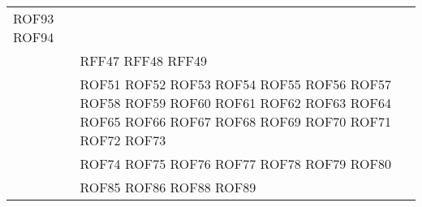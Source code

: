 \documentclass[../DefinizioneDiProdotto_v3.0.0.tex]{subfiles}
\begin{document}
\begin{longtable}{p{8.5cm}!{\VRule[1pt]}p{2.5cm}}
	ROF93 \newline
	ROF94 \\
	                                                             &   RFF47 \newline
	RFF48 \newline
	RFF49 \\
	                                                         & ROF51 \newline
	ROF52 \newline
	ROF53 \newline
	ROF54 \newline
	ROF55 \newline
	ROF56 \newline
	ROF57 \newline
	ROF58 \newline
	ROF59 \newline
	ROF60 \newline
	ROF61 \newline
	ROF62 \newline
	ROF63 \newline
	ROF64 \newline
	ROF65 \newline
	ROF66 \newline
	ROF67 \newline
	ROF68 \newline
	ROF69 \newline
	ROF70 \newline
	ROF71 \newline
	ROF72 \newline
	ROF73 \\
	                                                                 & ROF74 \newline
	ROF75 \newline
	ROF76 \newline
	ROF77 \newline
	ROF78 \newline
	ROF79 \newline
	ROF80 \newline
	 \\
	  		                            & ROF85 \newline
	ROF86 \newline
	ROF88 \newline
	ROF89 \newline

\end{longtable}
\end{document}

